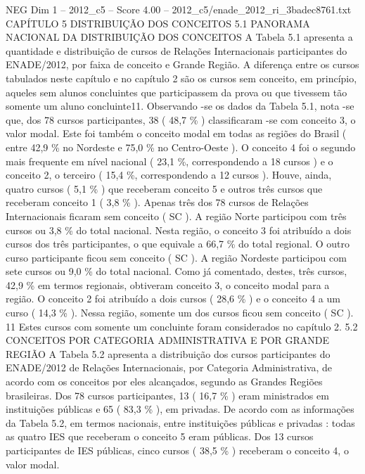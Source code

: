 \begin{textsample}{NEG Dim 1 – 2012\_c5 – Score 4.00 – 2012\_c5/enade\_2012\_ri\_3badec8761.txt}  \label{ex:f1_neg_321}
CAPÍTULO 5 DISTRIBUIÇÃO DOS CONCEITOS 5.1 PANORAMA NACIONAL DA DISTRIBUIÇÃO DOS CONCEITOS A Tabela 5.1 apresenta a quantidade e distribuição de cursos de Relações Internacionais participantes do ENADE/2012, por faixa de conceito e Grande Região.
A diferença entre os cursos tabulados neste capítulo e no capítulo 2 são os cursos sem conceito, em princípio, aqueles sem alunos concluintes que participassem da prova ou que tivessem tão somente um aluno concluinte11.
Observando -se os dados da Tabela 5.1, nota -se que, dos 78 cursos participantes, 38 ( 48,7 \% ) classificaram -se com conceito 3, o valor modal.
Este foi também o conceito modal em todas as regiões do Brasil ( entre 42,9 \% no Nordeste e 75,0 \% no Centro-Oeste ).
O conceito 4 foi o segundo mais frequente em nível nacional ( 23,1 \%, correspondendo a 18 cursos ) e o conceito 2, o terceiro ( 15,4 \%, correspondendo a 12 cursos ).
Houve, ainda, quatro cursos ( 5,1 \% ) que receberam conceito 5 e outros três cursos que receberam conceito 1 ( 3,8 \% ).
Apenas três dos 78 cursos de Relações Internacionais ficaram sem conceito ( SC ).
A região Norte participou com três cursos ou 3,8 \% do total nacional.
Nesta região, o conceito 3 foi atribuído a dois cursos dos três participantes, o que equivale a 66,7 \% do total regional.
O outro curso participante ficou sem conceito ( SC ).
A região Nordeste participou com sete cursos ou 9,0 \% do total nacional.
Como já comentado, destes, três cursos, 42,9 \% em termos regionais, obtiveram conceito 3, o conceito modal para a região.
O conceito 2 foi atribuído a dois cursos ( 28,6 \% ) e o conceito 4 a um curso ( 14,3 \% ).
Nessa região, somente um dos cursos ficou sem conceito ( SC ). 11 Estes cursos com somente um concluinte foram considerados no capítulo 2. 5.2 CONCEITOS POR CATEGORIA ADMINISTRATIVA E POR GRANDE REGIÃO A Tabela 5.2 apresenta a distribuição dos cursos participantes do ENADE/2012 de Relações Internacionais, por Categoria Administrativa, de acordo com os conceitos por eles alcançados, segundo as Grandes Regiões brasileiras.
Dos 78 cursos participantes, 13 ( 16,7 \% ) eram ministrados em instituições públicas e 65 ( 83,3 \% ), em privadas.
De acordo com as informações da Tabela 5.2, em termos nacionais, entre instituições públicas e privadas : todas as quatro IES que receberam o conceito 5 eram públicas.
Dos 13 cursos participantes de IES públicas, cinco cursos ( 38,5 \% ) receberam o conceito 4, o valor modal.

\end{textsample}
